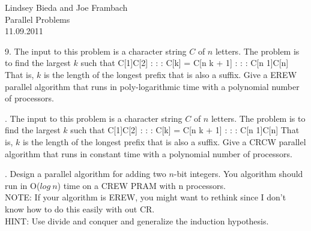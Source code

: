 \documentclass[10pt]{article}
\begin{document}
	\begin{flushright}
	Lindsey Bieda and Joe Frambach\\
	Parallel Problems\\
	11.09.2011
	\end{flushright}

9. The input to this problem is a character string $C$ of $n$ letters. The problem is to find the largest $k$
such that
C[1]C[2] : : : C[k] = C[n  k + 1] : : : C[n  1]C[n]
That is, $k$ is the length of the longest prefix that is also a suffix. Give a EREW parallel algorithm that
runs in poly-logarithmic time with a polynomial number of processors.

. The input to this problem is a character string $C$ of $n$ letters. The problem is to find the largest $k$
such that
C[1]C[2] : : : C[k] = C[n  k + 1] : : : C[n  1]C[n]
That is, $k$ is the length of the longest prefix that is also a suffix. Give a CRCW parallel algorithm that
runs in constant time with a polynomial number of processors.

. Design a parallel algorithm for adding two $n$-bit integers. You algorithm should run in O($log~n$) time
on a CREW PRAM with n processors.\\
NOTE: If your algorithm is EREW, you might want to rethink since I don't know how to do this easily
with out CR.\\
HINT: Use divide and conquer and generalize the induction hypothesis.
\end{document}
